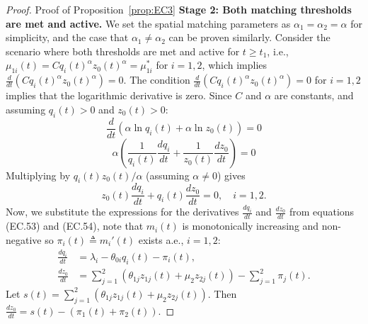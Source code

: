 \begin{proof}{Proof of Proposition~\ref{prop:EC3}}
\textbf{Stage 2: Both matching thresholds are met and active.}
We set the spatial matching parameters as $\alpha_1 = \alpha_2 = \alpha$ for simplicity, and the case that $\alpha_1 \neq \alpha_2$ can be proven similarly.
Consider the scenario where both thresholds are met and active for $t \ge t_1$, i.e., $\mu_{1i}(t) = C q_i(t)^{\alpha} z_0(t)^{\alpha} = \mu_{1i}^*$ for $i=1,2$, which implies $\frac{d}{dt} (C q_i(t)^{\alpha} z_0(t)^{\alpha}) = 0$.
The condition $\frac{d}{dt} (C q_i(t)^{\alpha} z_0(t)^{\alpha}) = 0$ for $i=1,2$ implies that the logarithmic derivative is zero. Since $C$ and $\alpha$ are constants, and assuming $q_i(t) > 0$ and $z_0(t) > 0$:
\begin{equation*}
  \frac{d}{dt} (\alpha \ln q_i(t) + \alpha \ln z_0(t)) = 0
\end{equation*}
\begin{equation*}
  \alpha \left( \frac{1}{q_i(t)}\frac{dq_i}{dt} + \frac{1}{z_0(t)}\frac{dz_0}{dt} \right) = 0
\end{equation*}
Multiplying by $q_i(t)z_0(t)/\alpha$ (assuming $\alpha \neq 0$) gives
\begin{equation*}
  z_0(t)\frac{dq_i}{dt} + q_i(t)\frac{dz_0}{dt} = 0, \quad i=1,2.
\end{equation*}
Now, we substitute the expressions for the derivatives $\frac{dq_i}{dt}$ and $\frac{dz_0}{dt}$ from equations (EC.53) and (EC.54), note that $m_i(t)$ is monotonically increasing and non-negative so $\pi_i(t) \triangleq m_i'(t)$ exists a.e., $i=1,2$:
\begin{align*} 
    \frac{dq_i}{dt} &= \lambda_i - \theta_{0i}q_i(t) - \pi_i(t), \\ 
    \frac{dz_0}{dt} &= \sum_{j=1}^{2}(\theta_{1j}z_{1j}(t) + \mu_2z_{2j}(t)) - \sum_{j=1}^{2}\pi_j(t).
\end{align*}
Let $s(t) = \sum_{j=1}^{2}(\theta_{1j}z_{1j}(t) + \mu_2z_{2j}(t))$. Then $\frac{dz_0}{dt} = s(t) - (\pi_1(t) + \pi_2(t))$.


\end{proof}
